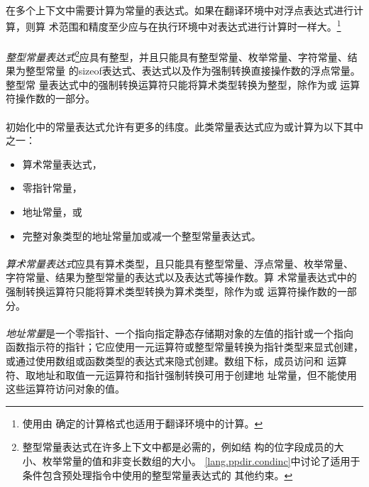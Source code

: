 {\semantic
\paragraph{}
在多个上下文中需要计算为常量的表达式。如果在翻译环境中对浮点表达式进行计算，则算
术范围和精度至少应与在执行环境中对表达式进行计算时一样大。\footnote{使用由
确定的计算格式也适用于翻译环境中的计算。}

\paragraph{}
\textit{整型常量表达式}\footnote{整型常量表达式在许多上下文中都是必需的，例如结
构的位字段成员的大小、枚举常量的值和非变长数组的大小。
\ref{lang.ppdir.condinc}中讨论了适用于条件包含预处理指令中使用的整型常量表达式的
其他约束。}应具有整型，并且只能具有整型常量、枚举常量、字符常量、结果为整型常量
的sizeof表达式、表达式以及作为强制转换直接操作数的浮点常量。整型常
量表达式中的强制转换运算符只能将算术类型转换为整型，除作为或
运算符操作数的一部分。

\paragraph{}
初始化中的常量表达式允许有更多的纬度。此类常量表达式应为或计算为以下其中之一：
\begin{itemize}
  \item{算术常量表达式，}
  \item{零指针常量，}
  \item{地址常量，或}
  \item{完整对象类型的地址常量加或减一个整型常量表达式。}
\end{itemize}

\paragraph{}
\textit{算术常量表达式}应具有算术类型，且只能具有整型常量、浮点常量、枚举常量、
字符常量、结果为整型常量的表达式以及表达式等操作数。算
术常量表达式中的强制转换运算符只能将算术类型转换为算术类型，除作为或
运算符操作数的一部分。

\paragraph{}
\textit{地址常量}是一个零指针、一个指向指定静态存储期对象的左值的指针或一个指向
函数指示符的指针；它应使用一元运算符\tm{\&}或整型常量转换为指针类型来显式创建，
或通过使用数组或函数类型的表达式来隐式创建。数组下标\tm{[]}，成员访问和
\tm{-\tg}运算符、取地址\tm{\&}和取值\tm{*}一元运算符和指针强制转换可用于创建地
址常量，但不能使用这些运算符访问对象的值。

}
